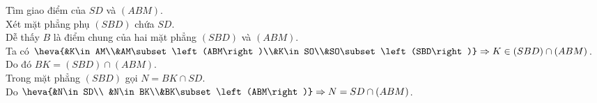 \begin{ex}
{\begin{itemchoice}
			Tìm giao điểm của $ SD$ và $\left(ABM\right)$.\\
			Xét mặt phẳng phụ $\left(SBD\right)$ chứa $SD$.\\
			Dễ thấy $B$ là điểm chung của hai mặt phẳng $\left(SBD\right)$ và $\left(ABM\right)$.\\
			Ta có $\heva{&K\in AM\\&AM\subset\left(ABM\right)\\&K\in SO\\&SO\subset\left(SBD\right)}
			\Rightarrow K\in\left(SBD\right)\cap\left(ABM\right)$.\\ Do đó $ BK=\left(SBD\right)\cap\left(ABM\right)$.\\
			Trong mặt phẳng $\left(SBD\right)$ gọi $ N=BK\cap SD$.\\
			Do $\heva{&N\in SD\\
				&N\in BK\\&BK\subset\left(ABM\right)}
				\Rightarrow N=SD\cap\left(ABM\right)$.
		\end{itemchoice}
		}
\end{ex}


